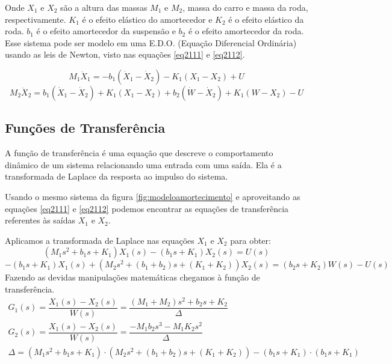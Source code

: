 Onde $X_1$ e $X_2$ são a altura das massas $M_1$ e $M_2$, massa do carro e massa da roda, respectivamente. $K_1$ é o efeito elástico do amortecedor e $K_2$ é o efeito elástico da roda. $b_1$ é o efeito amortecedor da suspensão e $b_2$ é o efeito amortecedor da roda.
Esse sistema pode ser modelo em uma E.D.O. (Equação Diferencial Ordinária) usando as leis de Newton, visto nas equações \ref{eq2111} e \ref{eq2112}.

\begin{equation} \label{eq2111}
M_1 \ddot{X}_1=-b_1(\dot{X}_1-\dot{X}_2) -K_1(X_1-X_2)+U
\end{equation}
\begin{equation} \label{eq2112}
M_2 \ddot{X}_2=b_1 (\dot{X}_1 -\dot{X}_2) +K_1(X_1-X_2) +b_2(\dot{W} -\dot{X}_2)+K_1(W-X_2) -U
\end{equation}

\subsection{Funções de Transferência}
A função de transferência é uma equação que descreve o comportamento dinâmico de um sistema relacionando uma entrada com uma saída. Ela é a transformada de Laplace da resposta ao impulso do sistema.

Usando o mesmo sistema da figura \ref{fig:modeloamortecimento} e aproveitando as equações \ref{eq2111} e \ref{eq2112} podemos encontrar as equações de transferência referentes às saídas $X_1$ e $X_2$.

Aplicamos a transformada de Laplace nas equações $X_1$ e $X_2$ para obter:
\begin{equation} \label{eq2121}
(M_1s^2+b_1s+K_1) X_1(s) -(b_1s+K_1) X_2(s)=U(s)
\end{equation}
\begin{equation} \label{eq2122}
-(b_1s+ K_1) X_1(s) +(M_2s^2 + (b_1 + b_2)s +(K_1 + K_2))X_2(s)=(b_2s +K_2) W(s)-U(s)
\end{equation}
Fazendo as devidas manipulações matemáticas chegamos à função de transferência.
\begin{equation}\label{eq2123}
\begin{array}{c}
G_1(s)=\dfrac{X_1(s)-X_2(s)}{W(s)}= \dfrac{(M_1+M_2)s^2+b_2s+K_2} {\Delta}
\\
G_2(s)=\dfrac{X_1(s)-X_2(s)}{W(s)}= \dfrac{-M_1b_2s^3-M_1K_2s^2}{\Delta}
\\
\Delta=(M_1s^2+b_1s+K_1)\cdot (M_2s^2+ (b_1+b_2)s+(K_1+K_2))-(b_1s+K_1)\cdot (b_1s+K_1)
\end{array}
\end{equation}

